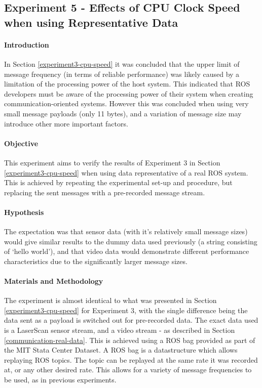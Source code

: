 \documentclass[../dissertation.tex]{subfiles}
\begin{document}
\subsection{Experiment 5 - Effects of CPU Clock Speed when using Representative Data}
\label{exp-5}

\paragraph{Introduction} In Section \ref{experiment3-cpu-speed} it was concluded that the upper limit of message frequency (in terms of reliable performance) was likely caused by a limitation of the processing power of the host system. This indicated that ROS developers must be aware of the processing power of their system when creating communication-oriented systems. However this was concluded when using very small message payloads (only 11 bytes), and a variation of message size may introduce other more important factors.

\paragraph{Objective} This experiment aims to verify the results of Experiment 3 in Section \ref{experiment3-cpu-speed} when using data representative of a real ROS system. This is achieved by repeating the experimental set-up and procedure, but replacing the sent messages with a pre-recorded message stream.

\paragraph{Hypothesis} The expectation was that sensor data (with it's relatively small message sizes) would give similar results to the dummy data used previously (a string consisting of `hello world'), and that video data would demonstrate different performance characteristics due to the significantly larger message sizes.

\paragraph{Materials and Methodology} The experiment is almost identical to what was presented in Section \ref{experiment3-cpu-speed} for Experiment 3, with the single difference being the data sent as a payload is switched out for pre-recorded data. The exact data used is a LaserScan sensor stream, and a video stream - as described in Section \ref{communication-real-data}. This is achieved using a ROS bag provided as part of the MIT Stata Center Dataset. A ROS bag is a datastructure which allows replaying ROS topics. The topic can be replayed at the same rate it was recorded at, or any other desired rate. This allows for a variety of message frequencies to be used, as in previous experiments.
\end{document}
